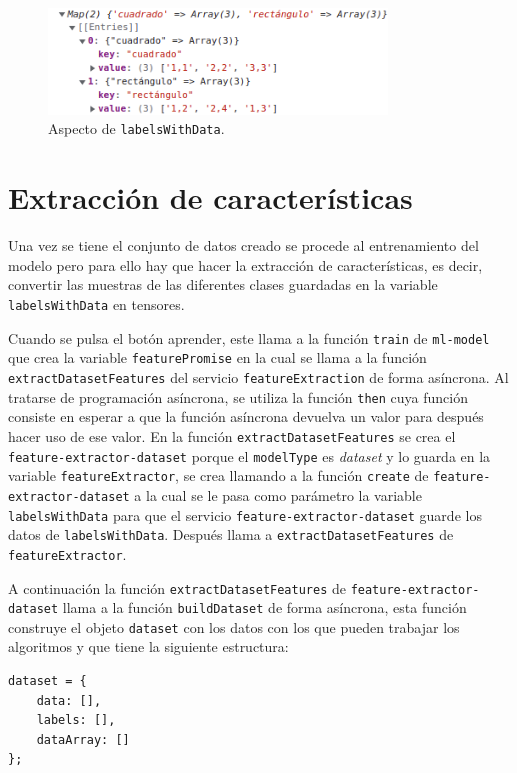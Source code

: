\documentclass[a4paper, 12pt]{book}
\begin{document}
\begin{figure}
	\centering
	\includegraphics[width=9cm, keepaspectratio]{img/ejemplo1.png}
	\caption{Aspecto de \texttt{labelsWithData}.} 	\label{fig:ejemplo1}
\end{figure}


\section{Extracción de características}
\label{subsec:caracteristicas}

Una vez se tiene el conjunto de datos creado se procede al entrenamiento del modelo pero para ello hay que hacer la extracción de características, es decir, convertir las muestras de las diferentes clases guardadas en la variable \texttt{labelsWithData} en tensores.

Cuando se pulsa el botón aprender, este llama a la función \texttt{train} de \texttt{ml-model} que crea la variable \texttt{featurePromise} en la cual se llama a la función \texttt{extractDatasetFeatures} del servicio \texttt{featureExtraction} de forma asíncrona. 
Al tratarse de programación asíncrona, se utiliza la función \texttt{then} cuya función consiste en esperar a que la función asíncrona devuelva un valor para después hacer uso de ese valor. 
En la función \texttt{extractDatasetFeatures} se crea el \texttt{feature-extractor-dataset} porque el \texttt{modelType} es \emph{dataset} y lo guarda en la variable \texttt{featureExtractor}, se crea llamando a la función \texttt{create} de \texttt{feature-
extractor-dataset} a la cual se le pasa como parámetro la variable \texttt{labelsWithData} para que el servicio \texttt{feature-extractor-dataset} guarde los datos de \texttt{labelsWithData}. 
Después llama a \texttt{extractDatasetFeatures} de \texttt{featureExtractor}.

A continuación la función \texttt{extractDatasetFeatures} de \texttt{feature-extractor-dataset} llama a la función \texttt{buildDataset} de forma asíncrona, esta función construye el objeto \texttt{dataset} con los datos con los que pueden trabajar los algoritmos y que tiene la siguiente estructura:
\begin{verbatim}
dataset = {
    data: [],
    labels: [],
    dataArray: []
};
\end{verbatim}
\end{document}
